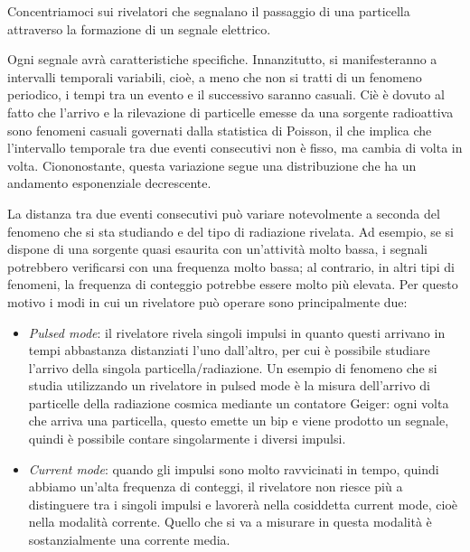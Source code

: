 Concentriamoci sui rivelatori che segnalano il passaggio di una particella attraverso la formazione di un segnale elettrico.

\begin{figure}[H]
   \centering
\end{figure}

Ogni segnale avrà caratteristiche specifiche. Innanzitutto, si manifesteranno a intervalli temporali variabili, cioè, a meno che non si tratti di un fenomeno periodico, i tempi tra un evento e il successivo saranno casuali. Ciè è dovuto al fatto che l'arrivo e la rilevazione di particelle emesse da una sorgente radioattiva sono fenomeni casuali governati dalla statistica di Poisson, il che implica che l'intervallo temporale tra due eventi consecutivi non è fisso, ma cambia di volta in volta. Ciononostante, questa variazione segue una distribuzione che ha un andamento esponenziale decrescente.

La distanza tra due eventi consecutivi può variare notevolmente a seconda del fenomeno che si sta studiando e del tipo di radiazione rivelata. Ad esempio, se si dispone di una sorgente quasi esaurita con un'attività molto bassa, i segnali potrebbero verificarsi con una frequenza molto bassa; al contrario, in altri tipi di fenomeni, la frequenza di conteggio potrebbe essere molto più elevata. Per questo motivo i modi in cui un rivelatore può operare sono principalmente due:

\begin{itemize}
   \item \textit{Pulsed mode}: il rivelatore rivela singoli impulsi in quanto questi arrivano in tempi abbastanza distanziati l'uno dall'altro, per cui è possibile studiare l'arrivo della singola particella/radiazione. Un esempio di fenomeno che si studia utilizzando un rivelatore in pulsed mode è la misura dell'arrivo di particelle della radiazione cosmica mediante un contatore Geiger: ogni volta che arriva una particella, questo emette un bip e viene prodotto un segnale, quindi è possibile contare singolarmente i diversi impulsi.
   \item \textit{Current mode}: quando gli impulsi sono molto ravvicinati in tempo, quindi abbiamo un'alta frequenza di conteggi, il rivelatore non riesce più a distinguere tra i singoli impulsi e lavorerà nella cosiddetta current mode, cioè nella modalità corrente. Quello che si va a misurare in questa modalità è sostanzialmente una corrente media.
\end{itemize}

